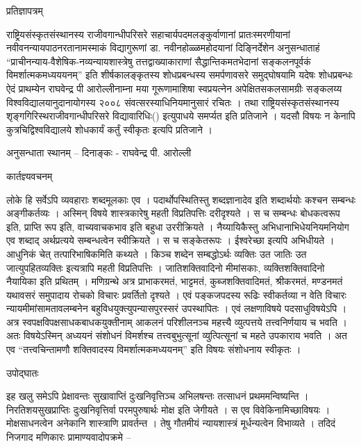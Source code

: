 प्रतिज्ञापत्रम्

	राष्ट्रियसंस्कृतसंस्थानस्य राजीवगान्धीपरिसरे सहाचार्यपदमलङ्कुर्वाणानां प्रातःस्मरणीयानां नवीवनन्यायपाठनरतानामस्माकं विद्यागुरूणां डा. नवीनहोळ्ळमहोदयानां दिङ्निर्देशेन अनुसन्धाताहं “प्राचीनन्याय-वैशेषिक-नव्यन्यायशास्त्रेषु तत्तद्वाख्याकाराणां सैद्धान्तिकमतभेदानां सङ्कलनपूर्वकं विमर्शात्मकमध्यययनम्” इति शीर्षकालङ्कृतस्य शोधप्रबन्धस्य समर्पणावसरे समुद्घोषयामि यदेषः शोधप्रबन्धः ऐदं प्राथम्येन राघवेन्द्र पी आरोल्लीनाम्ना  मया गूरूणामाशिषा स्वप्रयत्नेन अपेक्षितसकलसामग्रीः सङ्कलय्य विश्वविद्यालयानुदानायोगस्य २००८ संवत्सरस्याधिनियमानुसारं रचितः । तथा राष्ट्रियसंस्कृतसंस्थानस्य शृङ्गगिरिस्थराजीवगान्धीपरिसरे विद्यावारिधिः() इत्युपाधये समर्प्यत इति प्रतिजाने । यदसौ विषयः न केनापि कुत्रचिद्विश्वविद्यालये शोधकार्यं कर्तुं स्वीकृतः इत्यपि प्रतिजाने ।



									अनुसन्धाता
स्थानम् –
दिनाङ्कः -  						राघवेन्द्र पी. आरोल्ली

कार्तज्ञ्यवचनम्

	लोके हि सर्वेऽपि व्यवहाराः शब्दमूलकाः एव । पदार्थोपस्थितिस्तु शब्दज्ञानादेव इति शब्दार्थयोः कश्चन सम्बन्धः अङ्गीकर्तव्यः । अस्मिन् विषये शास्त्रकारेषु महती विप्रतिपत्तिः दरीदृश्यते । स च सम्बन्धः बोधकत्वरूप इति, प्राप्ति रूप इति, वाच्यवाचकभाव इति बहुधा उररीक्रियते । नैय्यायिकैस्तु अभिधानाभिधेयनियमनियोग एव शब्दाद् अर्थप्रत्यये सम्बन्धत्वेन स्वीक्रियते । स च सङ्केतरूपः । ईश्वरेच्छा इत्यपि अभिधीयते । आधुनिकं चेत् तत्पारिभाषिकमिति कथ्यते । किञ्च शब्देन सम्बद्धोऽर्थः व्यक्तिः उत जातिः उत जात्युपहितव्यक्तिः इत्यत्रापि महती विप्रतिपत्तिः । जातिशक्तिवादिनो मीमांसकाः, व्यक्तिशक्तिवादिनो नैयायिका इति प्रथितम् । मणिग्रन्थे अत्र प्राभाकरमतं, भाट्टमतं, कुब्जशक्तिवादिमतं, श्रीकरमतं, मण्डनमतं यथावसरं समुपादाय रोचको विचारः प्रवर्तितो दृश्यते । एवं पङ्कजपदस्य रूढिः स्वीकर्तव्या न वेति विचारः न्यायमीमांसामतावलम्बनेन बहुविधयुक्त्युपन्यासपुरस्सरं उपस्थापितः । एवं लक्षणाविषये पदसाधुविषयेऽपि । अत्र स्वपक्षविपक्षसाधकबाधकयुक्तीनाम् आकलनं परिशीलनञ्च महत्त्यै व्युत्पत्तये तत्त्वनिर्णयाय च भवति । अतः विषयेऽस्मिन् अध्ययनं संशोधनं विमर्शश्च तत्त्वबुभुत्सूनां व्युत्पित्सूनां च महते उपकाराय भवति । अत एव “तत्त्वचिन्तामणौ शक्तिवादस्य विमर्शात्मकमध्ययनम्” इति विषयः संशोधनाय स्वीकृतः । 




	उपोद्घातः
	
	इह खलु समेऽपि प्रेक्षावन्तः सुखावाप्तिं दुःखनिवृत्तिञ्च अभिलषन्तः तत्साधनं प्रथममन्विष्यन्ति । निरतिशयसुखप्राप्तिः दुःखनिवृत्तिर्वा परमपुरुषार्थः मोक्ष इति जेगीयते । स एव विवेकिनामिच्छाविषयः । मोक्षसाधनत्वेन अनेकानि शास्त्राणि प्रावर्तन्त । तेषु गौतमीयं न्यायशास्त्रं मूर्धन्यत्वेन विभाव्यते । तदिदं निजगाद मणिकारः प्रामाण्यवादोपक्रमे – 

